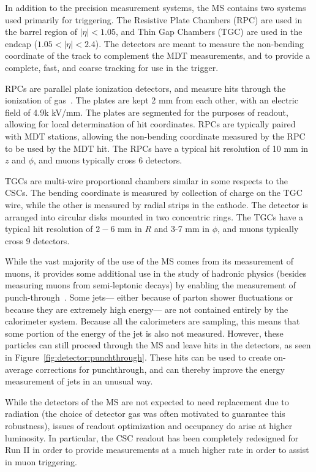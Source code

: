 In addition to the precision measurement systems, the MS contains two systems used primarily for triggering. The Resistive Plate Chambers (RPC) are used in the barrel region of $|\eta| < 1.05$, and Thin Gap Chambers (TGC) are used in the endcap ($1.05 < |\eta| < 2.4$). The detectors are meant to measure the non-bending coordinate of the track to complement the MDT measurements, and to provide a complete, fast, and coarse tracking for use in the trigger. 

RPCs are parallel plate ionization detectors, and measure hits through the ionization of gas~\cite{Detectors,ATLASPaper}. The plates are kept 2 mm from each other, with an electric field of 4.9k kV/mm. The plates are segmented for the purposes of readout, allowing for local determination of hit coordinates. RPCs are typically paired with MDT stations, allowing the non-bending coordinate measured by the RPC to be used by the MDT hit. The RPCs have a typical hit resolution of 10 mm in $z$ and $\phi$, and muons typically cross 6 detectors. 

TGCs are multi-wire proportional chambers similar in some respects to the CSCs. The bending coordinate is measured by collection of charge on the TGC wire, while the other is measured by radial strips in the cathode. The detector is arranged into circular disks mounted in two concentric rings. The TGCs have a typical hit resolution of $2-6$ mm in $R$ and 3-7 mm in $\phi$, and muons typically cross 9 detectors.

While the vast majority of the use of the MS comes from its measurement of muons, it provides some additional use in the study of hadronic physics (besides measuring muons from semi-leptonic decays) by enabling the measurement of punch-through~\cite{JES2010}. Some jets--- either because of parton shower fluctuations or because they are extremely high energy--- are not contained entirely by the calorimeter system. Because all the calorimeters are sampling, this means that some portion of the energy of the jet is also not measured. However, these particles can still proceed through the MS and leave hits in the detectors, as seen in Figure~\ref{fig:detector:punchthrough}. These hits can be used to create on-average corrections for punchthrough, and can thereby improve the energy measurement of jets in an unusual way.

While the detectors of the MS are not expected to need replacement due to radiation (the choice of detector gas was often motivated to guarantee this robustness), issues of readout optimization and occupancy do arise at higher luminosity. In particular, the CSC readout has been completely redesigned for Run II in order to provide measurements at a much higher rate in order to assist in muon triggering. 

